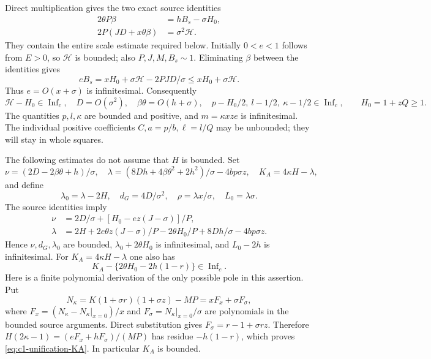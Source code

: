 Direct multiplication gives the two exact source identities
\begin{align}
 2\theta P\beta&=hB_s-\sigma H_0,\tag{BE3}\label{eq:c1-unification-source}\\
 2P(JD+x\theta\beta)&=\sigma^2\mathcal H.\tag{BE4}\label{eq:c1-unification-source-sphere}
\end{align}
They contain the entire scale estimate required below. Initially
$0<e<1$ follows from $E>0$, so $\mathcal H$ is bounded; also
$P,J,M,B_s\sim1$. Eliminating $\beta$ between the identities gives
\begin{equation}\label{eq:c1-unification-e-bound}
 eB_s=xH_0+\sigma\mathcal H-2PJD/\sigma
       \le xH_0+\sigma\mathcal H.
\end{equation}
Thus $e=O(x+\sigma)$ is infinitesimal. Consequently
\[
 \mathcal H-H_0\in\operatorname{Inf}_c,\quad
 D=O(\sigma^2),\quad \beta\theta=O(h+\sigma),\quad
 p-H_0/2,\ l-1/2,\ \kappa-1/2\in\operatorname{Inf}_c,
 \qquad H_0=1+zQ\ge1.
\]
The quantities $p,l,\kappa$ are bounded and positive, and
$m=\kappa xze$ is infinitesimal. The individual positive coefficients
$C,a=p/b,\ell=l/Q$ may be unbounded; they will stay in whole squares.

The following estimates do not assume that $H$ is bounded. Set
\[
 \nu=(2D-2\beta\theta+h)/\sigma,\quad
 \lambda=(8Dh+4\beta\theta^2+2h^2)/\sigma-4bp\sigma z,\quad
 K_A=4\kappa H-\lambda,
\]
and define
\[
 \lambda_0=\lambda-2H,\quad d_G=4D/\sigma^2,\quad
 \rho=\lambda x/\sigma,\quad L_0=\lambda\sigma.
\]
The source identities imply
\begin{align}
 \nu&=2D/\sigma+[H_0-ez(J-\sigma)]/P,\label{eq:c1-unification-nu}\\
 \lambda&=2H+2e\theta z(J-\sigma)/P
            -2\theta H_0/P+8Dh/\sigma-4bp\sigma z.
            \label{eq:c1-unification-lambda}
\end{align}
Hence $\nu,d_G,\lambda_0$ are bounded,
$\lambda_0+2\theta H_0$ is infinitesimal, and $L_0-2h$ is infinitesimal.
For $K_A=4\kappa H-\lambda$ one also has
\begin{equation}\label{eq:c1-unification-KA}
 K_A-\{2\theta H_0-2h(1-r)\}\in\operatorname{Inf}_c.
\end{equation}
Here is a finite polynomial derivation of the only possible pole in
this assertion. Put
\[
 N_\kappa=K(1+\sigma r)(1+\sigma z)-MP
          =xF_x+\sigma F_\sigma,
\]
where $F_x=(N_\kappa-N_\kappa|_{x=0})/x$ and
$F_\sigma=N_\kappa|_{x=0}/\sigma$ are polynomials in the bounded
source arguments. Direct substitution gives
$F_\sigma=r-1+\sigma rz$. Therefore
$H(2\kappa-1)=(eF_x+hF_\sigma)/(MP)$ has residue $-h(1-r)$,
which proves \eqref{eq:c1-unification-KA}. In particular $K_A$ is bounded.

